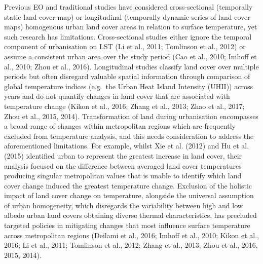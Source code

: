 \documentclass[]{book}
\begin{document}
Previous EO and traditional studies have considered cross-sectional
(temporally static land cover map) or longitudinal (temporally dynamic
series of land cover maps) homogenous urban land cover areas in relation
to surface temperature, yet such research has limitations.
Cross-sectional studies either ignore the temporal component of
urbanisation on LST (Li et al., 2011; Tomlinson et al., 2012) or assume
a consistent urban area over the study period (Cao et al., 2010; Imhoff
et al., 2010; Zhou et al., 2016). Longitudinal studies classify land
cover over multiple periods but often disregard valuable spatial
information through comparison of global temperature indices (e.g.~the
Urban Heat Island Intensity (UHII)) across years and do not quantify
changes in land cover that are associated with temperature change (Kikon
et al., 2016; Zhang et al., 2013; Zhao et al., 2017; Zhou et al., 2015,
2014). Transformation of land during urbanisation encompasses a broad
range of changes within metropolitan regions which are frequently
excluded from temperature analysis, and this needs consideration to
address the aforementioned limitations. For example, whilst Xie et al.
(2012) and Hu et al. (2015) identified urban to represent the greatest
increase in land cover, their analysis focused on the difference between
averaged land cover temperatures producing singular metropolitan values
that is unable to identify which land cover change induced the greatest
temperature change. Exclusion of the holistic impact of land cover
change on temperature, alongside the universal assumption of urban
homogeneity, which disregards the variability between high and low
albedo urban land covers obtaining diverse thermal characteristics, has
precluded targeted policies in mitigating changes that most influence
surface temperature across metropolitan regions (Deilami et al., 2016;
Imhoff et al., 2010; Kikon et al., 2016; Li et al., 2011; Tomlinson et
al., 2012; Zhang et al., 2013; Zhou et al., 2016, 2015, 2014).
\end{document}
